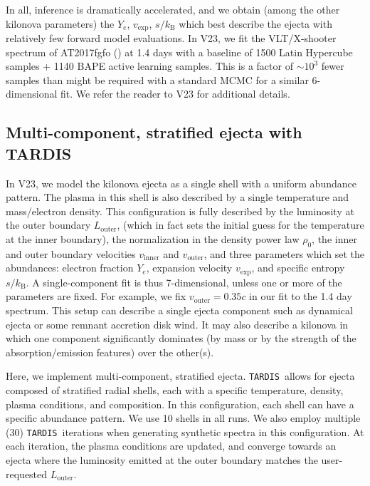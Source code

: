 \documentclass[twocolumn,twocolappendix]{aastex63}
\def\TARDIS{\texttt{TARDIS}}
\begin{document}
In all, inference is dramatically accelerated, and we obtain (among the other kilonova parameters) the $Y_e$, $v_{\mathrm{exp}}$, $s / k_{\mathrm{B}}$ which best describe the ejecta with relatively few forward model evaluations. In V23, we fit the VLT/X-shooter spectrum of AT2017fgfo (\citealt{pian17, smartt17}) at 1.4 days with a baseline of 1500 Latin Hypercube samples + 1140 BAPE active learning samples. This is a factor of $\sim 10^3$ fewer samples than might be required with a standard MCMC for a similar 6-dimensional fit. We refer the reader to V23 for additional details.




\subsection{Multi-component, stratified ejecta with \textsc{TARDIS}}\label{ssc:multi-component-TARDIS}

In V23, we model the kilonova ejecta as a single shell with a uniform abundance pattern. The plasma in this shell is also described by a single temperature and mass/electron density. This configuration is fully described by the luminosity at the outer boundary $L_{\mathrm{outer}}$, (which in fact sets the initial guess for the temperature at the inner boundary), the normalization in the density power law $\rho_0$, the inner and outer boundary velocities $v_{\mathrm{inner}}$ and $v_{\mathrm{outer}}$, and three parameters which set the abundances: electron fraction $Y_e$, expansion velocity $v_{\mathrm{exp}}$, and specific entropy $s / k_{\mathrm{B}}$. A single-component fit is thus 7-dimensional, unless one or more of the parameters are fixed. For example, we fix $v_{\mathrm{outer}} = 0.35c$ in our fit to the 1.4 day spectrum. This setup can describe a single ejecta component such as dynamical ejecta or some remnant accretion disk wind. It may also describe a kilonova in which one component significantly dominates (by mass or by the strength of the absorption/emission features) over the other(s). 
    
Here, we implement multi-component, stratified ejecta. \TARDIS~allows for ejecta composed of stratified radial shells, each with a specific temperature, density, plasma conditions, and composition. In this configuration, each shell can have a specific abundance pattern. We use 10 shells in all runs. We also employ multiple (30) \TARDIS~iterations when generating synthetic spectra in this configuration. At each iteration, the plasma conditions are updated, and converge towards an ejecta where the luminosity emitted at the outer boundary matches the user-requested $L_{\mathrm{outer}}$. 
    
\end{document}

